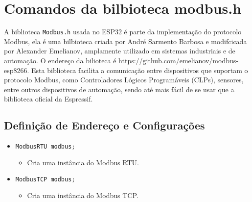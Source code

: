 \section{Comandos da bilbioteca modbus.h}
A biblioteca \texttt{Modbus.h} usada no ESP32 é parte da implementação do protocolo Modbus, ela é uma bilbioteca criada por André Sarmento Barbosa e modifcicada por Alexander Emelianov, amplamente utilizado em sistemas industriais e de automação. O endereço da bilioteca é https://github.com/emelianov/modbus-esp8266. Esta biblioteca facilita a comunicação entre dispositivos que suportam o protocolo Modbus, como Controladores Lógicos Programáveis (CLPs), sensores, entre outros dispositivos de automação, sendo até mais fácil de se usar que a biblioteca oficial da Espressif.

\subsection*{Definição de Endereço e Configurações}
\begin{itemize}
    \item \texttt{ModbusRTU modbus;}
    \begin{itemize}
        \item Cria uma instância do Modbus RTU.
    \end{itemize}
    \item \texttt{ModbusTCP modbus;}
    \begin{itemize}
        \item Cria uma instância do Modbus TCP.
    \end{itemize}
\end{itemize}

